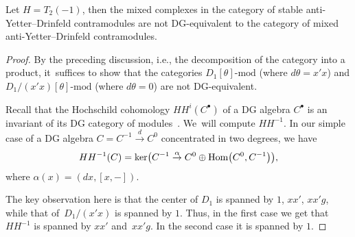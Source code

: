 \begin{Proposition}\label{notsscase}
Let $H=T_2(-1)$, then the mixed complexes in the category of stable anti-Yetter--Drinfeld contramodules are not DG-equivalent to the category of mixed anti-Yetter--Drinfeld contramodules.
\end{Proposition}
\begin{proof}
By the preceding discussion, i.e., the decomposition of the category into a product, it~suf\-fices to show that the categories $D_1[\theta]\text{-mod}$ (where $d\theta=x'x$) and $D_1/(x'x)[\theta]\text{-mod}$ (where $d\theta =0$) are not DG-equivalent.

Recall that the Hochschild cohomology $HH^i(C^\bullet)$ of a DG algebra $C^\bullet$ is an invariant of its DG category of modules~\cite{dginvar}. We~will compute $HH^{-1}$. In our simple case of a DG algebra $C=C^{-1}\stackrel{d}{\to} C^0$ concentrated in two degrees, we have
\begin{gather}
HH^{-1}(C)={\rm ker} \big(C^{-1}\stackrel{\alpha}{\to} C^0\oplus {\rm Hom}\big(C^0, C^{-1}\big)\big),
\end{gather}
where $\alpha(x)=(dx, [x,-])$.

The key observation here is that the center of $D_1$ is spanned by $1$, $xx'$, $xx'g$, while that of~$D_1/(x'x)$ is spanned by $1$. Thus, in the first case we get that $HH^{-1}$ is spanned by $xx'$ and~$xx'g$. In the second case it is spanned by $1$.
\end{proof}

